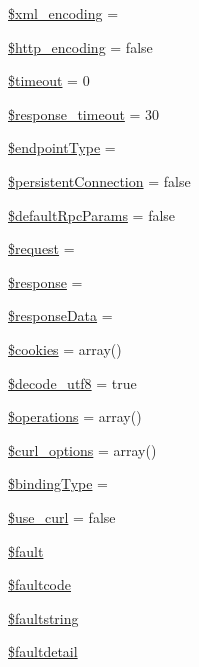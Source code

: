 \begin{DoxyCompactItemize}
\item 
\hyperlink{classnusoap__client_a1e2ee3fea6dbb8374da999a9df7d024d}{\$xml\+\_\+encoding} = \textquotesingle{}\textquotesingle{}
\item 
\hyperlink{classnusoap__client_a85ab29df53fb1ff64e0aecd9698b51fe}{\$http\+\_\+encoding} = false
\item 
\hyperlink{classnusoap__client_a84320a9bf3e591d7ae20dfcb0dfe6a0d}{\$timeout} = 0
\item 
\hyperlink{classnusoap__client_a17a3280264a8b9bb5ed32729d654739c}{\$response\+\_\+timeout} = 30
\item 
\hyperlink{classnusoap__client_a579908f25c2a105b23afaa84730b0a63}{\$endpoint\+Type} = \textquotesingle{}\textquotesingle{}
\item 
\hyperlink{classnusoap__client_a638b1c5f7dc55a3d0286136de6d56eab}{\$persistent\+Connection} = false
\item 
\hyperlink{classnusoap__client_ac78680bfe85d7e93ebe0d9260e104602}{\$default\+Rpc\+Params} = false
\item 
\hyperlink{classnusoap__client_abb35c8495a232b510389fa6d7b15d38a}{\$request} = \textquotesingle{}\textquotesingle{}
\item 
\hyperlink{classnusoap__client_af4b6fb1bbc77ccc05f10da3b16935b99}{\$response} = \textquotesingle{}\textquotesingle{}
\item 
\hyperlink{classnusoap__client_ab1e953a498fa4370be7a8806cea56031}{\$response\+Data} = \textquotesingle{}\textquotesingle{}
\item 
\hyperlink{classnusoap__client_aef9f7eafd54f6e36423347bed723c67e}{\$cookies} = array()
\item 
\hyperlink{classnusoap__client_a15fe586a802bc22337e3fe874d6da038}{\$decode\+\_\+utf8} = true
\item 
\hyperlink{classnusoap__client_a3f662373ff81db09eed5649d07f1931c}{\$operations} = array()
\item 
\hyperlink{classnusoap__client_a6f996237d5484e4538b2adf56de893e6}{\$curl\+\_\+options} = array()
\item 
\hyperlink{classnusoap__client_adf5d4b85487da9bd3d51527272af5196}{\$binding\+Type} = \textquotesingle{}\textquotesingle{}
\item 
\hyperlink{classnusoap__client_a372c0672391a16e4902e172ea3a0ae63}{\$use\+\_\+curl} = false
\item 
\hyperlink{classnusoap__client_a365691ed834f59a9a513180136e7a847}{\$fault}
\item 
\hyperlink{classnusoap__client_a07e7ee58f39f98cdd8b2bd2b40ff72d7}{\$faultcode}
\item 
\hyperlink{classnusoap__client_acc1a7d86f9bd39e5717add56fbcdfaaa}{\$faultstring}
\item 
\hyperlink{classnusoap__client_a7683364ae0ad0e22863a0f20f0626453}{\$faultdetail}
\end{DoxyCompactItemize}


